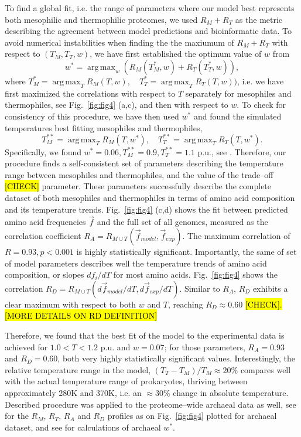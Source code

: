 \documentclass[10pt,letterpaper]{article}
\DeclareMathOperator*{\argmax}{arg\,max}
\begin{document}
To find a global fit, i.e. the range of parameters where our model best represents both mesophilic and thermophilic proteomes, we used $R_M + R_T$ as the metric describing the agreement between model predictions and bioinformatic data. To avoid numerical instabilities when finding the the maxiumum of $R_M+R_T$ with respect to $(T_M, T_T, w)$, we have first established the optimum value of $w$ from
$$
w^* = \argmax_{w} (R_M(T_M^*, w) + R_T(T^*_T,w) ),
$$
where $T_M^*=\argmax_{T}R_M(T,w), \quad T_T^*=\argmax_{T}R_T(T,w))$, i.e. we have first maximized the correlations with respect to $T$ separately for mesophiles and thermophiles, see Fig.~\ref{fig:fig4} (a,c), and then with respect to $w$. To check for consistency of this procedure, we have then used $w^*$ and found the simulated temperatures best fitting mesophiles and thermophiles, 
$$
T^{**}_M = \argmax_{T}R_M(T, w^*), \quad T^{**}_T = \argmax_{T}R_T(T, w^*).
$$
Specifically, we found $w^*=0.06,  T^{**}_M=0.9, T^{**}_T=1.1$ p.u., see . Therefore, our procedure finds a self-consistent set of parameters describing the temperature range between mesophiles and thermophiles, and the value of the trade--off \hl{[CHECK]} parameter. These parameters successfully describe the complete dataset of both mesophiles and thermophiles in terms of amino acid composition and its temperature trends. Fig.~\ref{fig:fig4} (c,d) shows the fit between predicted amino acid frequencies $\vec f$ and the full set of all genomes, measured as the correlation coefficient $R_A = R_{M \cup T}(\vec f_{model}, \vec f_{exp})$. The maximum correlation of $R=0.93, p<0.001$ is highly statistically significant. Importantly, the same of set of model parameters describes well the temperature trends of amino acid composition, or slopes $df_i/dT$ for most amino acids. Fig.~\ref{fig:fig4} shows the correlation $R_D = R_{M\cup T}(d\vec f_{model}{/dT}, d\vec f_{exp}/dT)$. Similar to $R_A$, $R_D$ exhibits a clear maximum with respect to both $w$ and $T$, reaching $R_D\approx0.60$ \hl{[CHECK]. [MORE DETAILS ON RD DEFINITION]}

Therefore, we found that the best fit of the model to the experimental data is achieved for $1.0<T<1.2$ p.u. and $w=0.07$; for those parameters, $R_A=0.93$ and $R_D=0.60$, both very highly statistically significant values. Interestingly, the relative temperature range in the model, $(T_T-T_M)/T_M\approx 20\%$ compares well with the actual temperature range of prokaryotes, thriving between approximately 280K and 370K, i.e. an $\approx 30\%$ change in absolute temperature. Described procedure was applied to the proteome--wide archaeal data as well, see  for the $R_M$, $R_T$, $R_A$ and $R_D$ profiles as on Fig.~\ref{fig:fig4} plotted for archaeal dataset, and see  for calculations of archaeal $w^*$.
\end{document}
